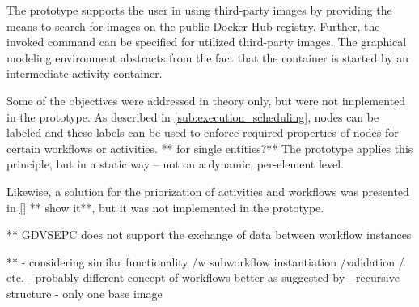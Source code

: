   The prototype supports the user in using third-party images by providing the means to search for images on the public Docker Hub registry. Further, the invoked command can be specified for utilized third-party images. The graphical modeling environment abstracts from the fact that the container is started by an intermediate activity container.


  Some of the objectives were addressed in theory only, but were not implemented in the prototype.
  As described in \ref{sub:execution_scheduling}, nodes can be labeled and these labels can be used to enforce required properties of nodes for certain workflows or activities. ** for single entities?**
  The prototype applies this principle, but in a static way -- not on a dynamic, per-element level.

  Likewise, a solution for the priorization of activities and workflows was presented in \ref{} ** show it**, but it was not implemented in the prototype.


  ** GDVSEPC does not support the exchange of data between workflow instances

  **
  - considering similar functionality /w subworkflow instantiation /validation / etc.    - probably different concept of workflows better as suggested by \cite[119]{Schulze1998Services}
   - recursive structure
   - only one base image
